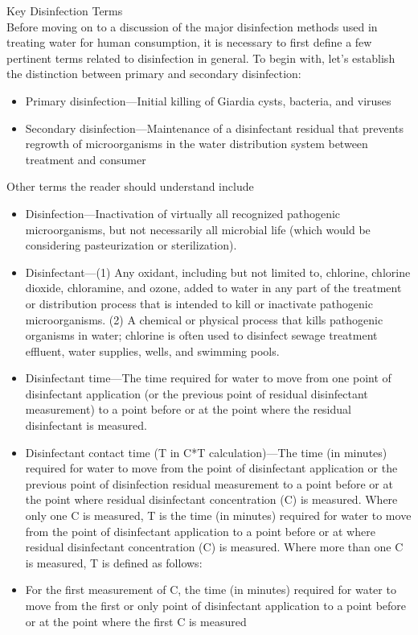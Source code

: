 Key Disinfection Terms\\
Before moving on to a discussion of the major disinfection methods used in treating water for human consumption, it is necessary to first define a few pertinent terms related to disinfection in general. To begin with, let’s establish the distinction between primary and secondary disinfection:
\begin{itemize}
\item Primary disinfection—Initial killing of Giardia cysts, bacteria, and viruses
\item Secondary disinfection—Maintenance of a disinfectant residual that prevents regrowth of microorganisms in the water distribution system between treatment and consumer
\end{itemize}
Other terms the reader should understand include
\begin{itemize}
\item Disinfection—Inactivation of virtually all recognized pathogenic microorganisms, but not necessarily all microbial life (which would be considering pasteurization or sterilization).
\item Disinfectant—(1) Any oxidant, including but not limited to, chlorine, chlorine dioxide, chloramine, and ozone, added to water in any part of the treatment or distribution process that is intended to kill or inactivate pathogenic microorganisms. (2) A chemical or physical process that kills pathogenic organisms in water; chlorine is often used to disinfect sewage treatment effluent, water supplies, wells, and swimming pools.
\item Disinfectant time—The time required for water to move from one point of disinfectant application (or the previous point of residual disinfectant measurement) to a point before or at the point where the residual disinfectant is measured.
\item Disinfectant contact time (T in C*T calculation)—The time (in minutes) required for water to move from the point of disinfectant application or the previous point of disinfection residual measurement to a point before or at
the point where residual disinfectant concentration (C) is measured. Where only one C is measured, T is the time (in minutes) required for water to move from the point of disinfectant application to a point before or at where residual disinfectant concentration (C) is measured. Where more than one C is measured, T is defined as follows:
\item For the first measurement of C, the time (in minutes) required for water to move from the first or only point of disinfectant application to a point before or at the point where the first C is measured

\end{itemize}
